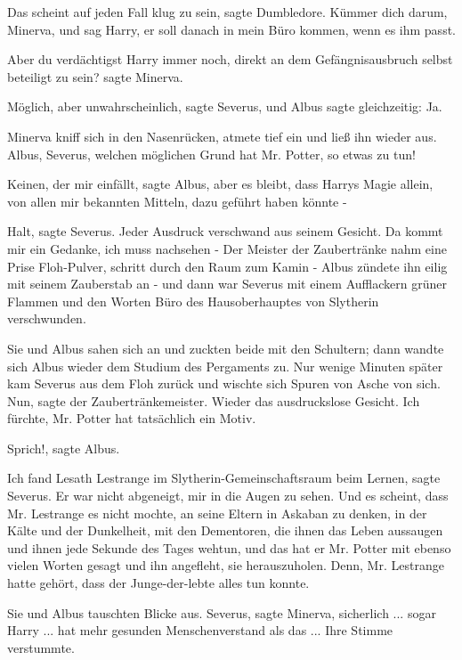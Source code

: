 \glqq{}Das scheint auf jeden Fall klug zu sein\grqq{}, sagte Dumbledore. \glqq{}
Kümmer dich darum, Minerva, und sag Harry, er soll danach in mein Büro kommen,
wenn es ihm passt.\grqq{}

\glqq{}Aber du verdächtigst Harry immer noch, direkt an dem Gefängnisausbruch
selbst beteiligt zu sein?\grqq{} sagte Minerva.

\glqq{}Möglich, aber unwahrscheinlich\grqq{}, sagte Severus, und Albus sagte
gleichzeitig: \glqq{}Ja.\grqq{}

Minerva kniff sich in den Nasenrücken, atmete tief ein und ließ ihn wieder aus.
\glqq{}Albus, Severus, welchen möglichen Grund hat Mr. Potter, so etwas zu
tun!\grqq{}

\glqq{}Keinen, der mir einfällt\grqq{}, sagte Albus, \glqq{}aber es bleibt, dass
Harrys Magie allein, von allen mir bekannten Mitteln, dazu geführt haben könnte
-\grqq{}

\glqq{}Halt\grqq{}, sagte Severus. Jeder Ausdruck verschwand aus seinem Gesicht.
\glqq{}Da kommt mir ein Gedanke, ich muss nachsehen -\grqq{} Der Meister der
Zaubertränke nahm eine Prise Floh-Pulver, schritt durch den Raum zum Kamin -
Albus zündete ihn eilig mit seinem Zauberstab an - und dann war Severus mit
einem Aufflackern grüner Flammen und den Worten \glqq{}Büro des Hausoberhauptes
von Slytherin\grqq{} verschwunden.

Sie und Albus sahen sich an und zuckten beide mit den Schultern; dann wandte
sich Albus wieder dem Studium des Pergaments zu. Nur wenige Minuten später kam
Severus aus dem Floh zurück und wischte sich Spuren von Asche von sich. \glqq{}
Nun\grqq{}, sagte der Zaubertränkemeister. Wieder das ausdruckslose Gesicht.
\glqq{}Ich fürchte, Mr. Potter hat tatsächlich ein Motiv.\grqq{}

\glqq{}Sprich!\grqq{}, sagte Albus.

\glqq{}Ich fand Lesath Lestrange im Slytherin-Gemeinschaftsraum beim
Lernen\grqq{}, sagte Severus. \glqq{}Er war nicht abgeneigt, mir in die Augen zu
sehen. Und es scheint, dass Mr. Lestrange es nicht mochte, an seine Eltern in
Askaban zu denken, in der Kälte und der Dunkelheit, mit den Dementoren, die
ihnen das Leben aussaugen und ihnen jede Sekunde des Tages wehtun, und das hat
er Mr. Potter mit ebenso vielen Worten gesagt und ihn angefleht, sie
herauszuholen. Denn, Mr. Lestrange hatte gehört, dass der Junge-der-lebte alles
tun konnte.\grqq{}

Sie und Albus tauschten Blicke aus. \glqq{}Severus\grqq{}, sagte Minerva, \glqq{}
sicherlich ... sogar Harry ... hat mehr gesunden Menschenverstand als das
...\grqq{} Ihre Stimme verstummte.

